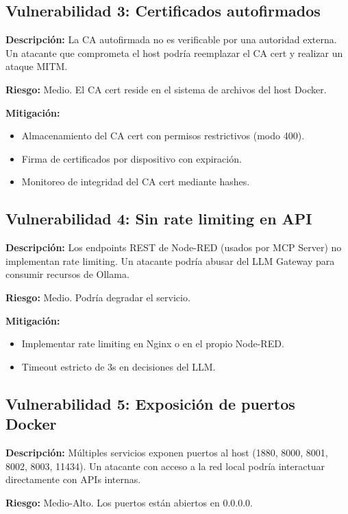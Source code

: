 \documentclass[12pt,letterpaper]{article}
\begin{document}
\subsection{Vulnerabilidad 3: Certificados autofirmados}

\textbf{Descripción:} La CA autofirmada no es verificable por una autoridad externa. Un atacante que comprometa el host podría reemplazar el CA cert y realizar un ataque MITM.

\textbf{Riesgo:} Medio. El CA cert reside en el sistema de archivos del host Docker.

\textbf{Mitigación:}
\begin{itemize}
    \item Almacenamiento del CA cert con permisos restrictivos (modo 400).
    \item Firma de certificados por dispositivo con expiración.
    \item Monitoreo de integridad del CA cert mediante hashes.
\end{itemize}

\subsection{Vulnerabilidad 4: Sin rate limiting en API}

\textbf{Descripción:} Los endpoints REST de Node-RED (usados por MCP Server) no implementan rate limiting. Un atacante podría abusar del LLM Gateway para consumir recursos de Ollama.

\textbf{Riesgo:} Medio. Podría degradar el servicio.

\textbf{Mitigación:}
\begin{itemize}
    \item Implementar rate limiting en Nginx o en el propio Node-RED.
    \item Timeout estricto de 3s en decisiones del LLM.
\end{itemize}

\subsection{Vulnerabilidad 5: Exposición de puertos Docker}

\textbf{Descripción:} Múltiples servicios exponen puertos al host (1880, 8000, 8001, 8002, 8003, 11434). Un atacante con acceso a la red local podría interactuar directamente con APIs internas.

\textbf{Riesgo:} Medio-Alto. Los puertos están abiertos en 0.0.0.0.
\end{document}
